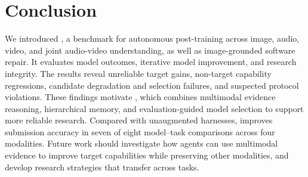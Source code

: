 \section{Conclusion}
\label{sec:discussion}
We introduced \benchmark{}, a benchmark for autonomous post-training across image, audio, video, and joint audio-video understanding, as well as image-grounded software repair. It evaluates model outcomes, iterative model improvement, and research integrity. The results reveal unreliable target gains, non-target capability regressions, candidate degradation and selection failures, and suspected protocol violations. These findings motivate \harness{}, which combines multimodal evidence reasoning, hierarchical memory, and evaluation-guided model selection to support more reliable research. Compared with unaugmented harnesses, \harness{} improves submission accuracy in seven of eight model--task comparisons across four modalities. Future work should investigate how agents can use multimodal evidence to improve target capabilities while preserving other modalities, and develop research strategies that transfer across tasks.
